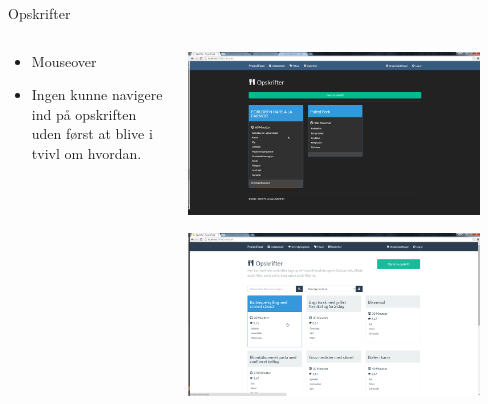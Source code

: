 \begin{frame}{Opskrifter}
	
	\begin{minipage}[0.3\textheight]{\textwidth}
	\begin{columns}[T]
	\begin{column}{0.5\textwidth}
	\begin{itemize}
	\item Mouseover
	\item Ingen kunne navigere ind på opskriften uden først at blive i tvivl om hvordan.

	
	\end{itemize}
	\end{column}
	\begin{column}{0.5\textwidth}
	 \includegraphics[width=0.9\textwidth,height=0.8\textheight,keepaspectratio]{images/Screenshots/RecipeOld.png}
	 
	 \vspace{2 mm}
	  
	  \includegraphics[width=0.9\textwidth,height=0.8\textheight,keepaspectratio]{images/Screenshots/Recipe.png}
	\end{column}
	\end{columns}
	

  \end{minipage}
  
  	
\end{frame}

